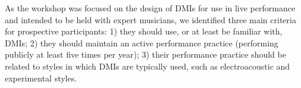 \documentclass[letterpaper, 12pt]{article}
\begin{document}


As the workshop was focused on the design of DMIs for use in live performance and intended to be held with expert musicians, we identified three main criteria for prospective participants: 1) they should use, or at least be familiar with, DMIs; 2) they should maintain an active performance practice (performing publicly at least five times per year); 3) their performance practice should be related to styles in which DMIs are typically used, such as electroacoustic and experimental styles.
\end{document}
